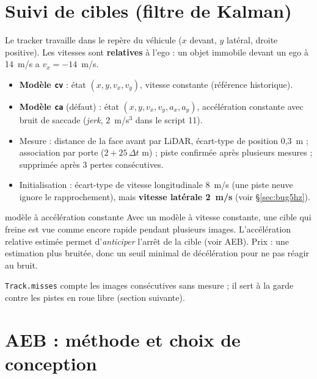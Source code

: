 \documentclass[11pt,a4paper]{article}
\providecommand{\og}{\guillemotleft\nobreakspace}
\providecommand{\fg}{\nobreakspace\guillemotright}
\newcommand{\code}[1]{\texttt{#1}}
\begin{document}
\section{Suivi de cibles (filtre de Kalman)}
Le tracker travaille dans le rep\`ere du v\'ehicule ($x$ devant, $y$ lat\'eral, droite positive). Les vitesses sont \textbf{relatives} \`a l'ego :
un objet immobile devant un ego \`a 14~m/s a $v_x=-14$~m/s.
\begin{itemize}
\item \textbf{Mod\`ele \code{cv}} : \'etat $(x,y,v_x,v_y)$, vitesse constante (r\'ef\'erence historique).
\item \textbf{Mod\`ele \code{ca}} (d\'efaut) : \'etat $(x,y,v_x,v_y,a_x,a_y)$, acc\'el\'eration constante avec bruit de saccade (\emph{jerk}, 2~m/s$^3$ dans le script 11).
\item Mesure : distance de la face avant par LiDAR, \'ecart-type de position 0,3~m ; association par porte ($2+25\,\Delta t$ m) ; piste confirm\'ee apr\`es plusieurs mesures ; supprim\'ee apr\`es 3 pertes cons\'ecutives.
\item Initialisation : \'ecart-type de vitesse longitudinale 8~m/s (une piste neuve ignore le rapprochement), mais \textbf{vitesse lat\'erale 2~m/s} (voir \S\ref{sec:bug5hz}).
\end{itemize}
\begin{choix}{mod\`ele \`a acc\'el\'eration constante}
Avec un mod\`ele \`a vitesse constante, une cible qui freine est vue comme \og encore rapide \fg{} pendant plusieurs images. L'acc\'el\'eration relative estim\'ee permet
d'\emph{anticiper} l'arr\^et de la cible (voir AEB). Prix : une estimation plus bruit\'ee, donc un seuil minimal de d\'ec\'el\'eration pour ne pas r\'eagir au bruit.
\end{choix}
\code{Track.misses} compte les images cons\'ecutives sans mesure ; il sert \`a la garde contre les pistes en roue libre (section suivante).

\section{AEB : m\'ethode et choix de conception}
\end{document}
